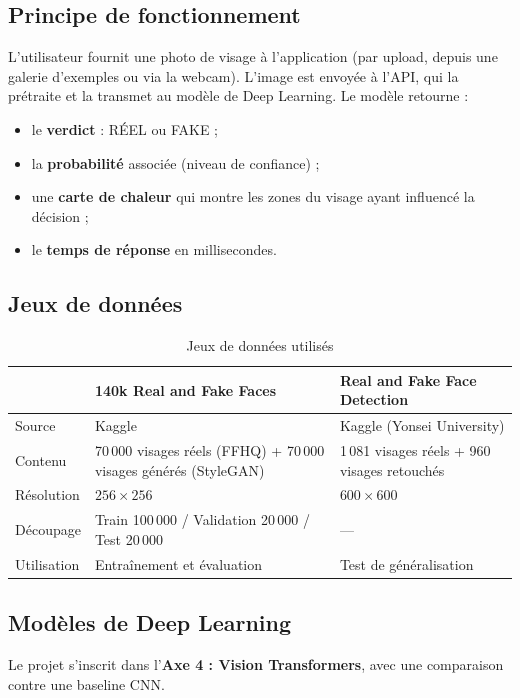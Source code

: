 \documentclass[11pt,a4paper]{article}
\begin{document}
\subsection{Principe de fonctionnement}
L'utilisateur fournit une photo de visage à l'application (par upload, depuis une galerie
d'exemples ou via la webcam). L'image est envoyée à l'API, qui la prétraite et la transmet au
modèle de Deep Learning. Le modèle retourne :
\begin{itemize}
  \item le \textbf{verdict} : \og RÉEL \fg{} ou \og FAKE \fg{} ;
  \item la \textbf{probabilité} associée (niveau de confiance) ;
  \item une \textbf{carte de chaleur} qui montre les zones du visage ayant influencé la décision ;
  \item le \textbf{temps de réponse} en millisecondes.
\end{itemize}

\subsection{Jeux de données}

\begin{table}[H]
\centering
\caption{Jeux de données utilisés}
\small
\begin{tabularx}{\linewidth}{@{}lXX@{}}
\toprule
& \textbf{140k Real and Fake Faces} & \textbf{Real and Fake Face Detection} \\
\midrule
Source & Kaggle & Kaggle (Yonsei University) \\
Contenu & 70\,000 visages réels (FFHQ) + 70\,000 visages générés (StyleGAN) &
1\,081 visages réels + 960 visages retouchés \\
Résolution & $256\times256$ & $600\times600$ \\
Découpage & Train 100\,000 / Validation 20\,000 / Test 20\,000 & --- \\
Utilisation & Entraînement et évaluation & Test de généralisation \\
\bottomrule
\end{tabularx}
\end{table}

\subsection{Modèles de Deep Learning}

Le projet s'inscrit dans l'\textbf{Axe 4 : Vision Transformers}, avec une comparaison contre une
baseline CNN.
\end{document}
